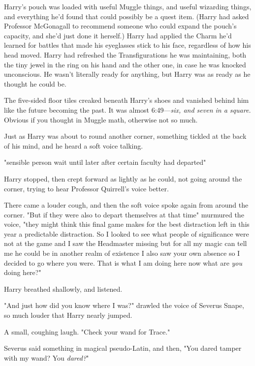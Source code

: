Harry's pouch was loaded with useful Muggle things, and useful wizarding
things, and everything he'd found that could possibly be a quest item. (Harry
had asked Professor McGonagall to recommend someone who could expand the
pouch's capacity, and she'd just done it herself.) Harry had applied the Charm
he'd learned for battles that made his eyeglasses stick to his face, regardless
of how his head moved. Harry had refreshed the Transfigurations he was
maintaining, both the tiny jewel in the ring on his hand and the other one, in
case he was knocked unconscious. He wasn't literally ready for anything, but
Harry was as ready as he thought he could be.

The five-sided floor tiles creaked beneath Harry's shoes and vanished behind
him like the future becoming the past. It was almost 6:49—\emph{six, and seven
in a square.} Obvious if you thought in Muggle math, otherwise not so much.

Just as Harry was about to round another corner, something tickled at the back
of his mind, and he heard a soft voice talking.

"{\el}sensible person{\el} wait until later{\el} after certain faculty
had departed{\el}"

Harry stopped, then crept forward as lightly as he could, not going around the
corner, trying to hear Professor Quirrell's voice better.

There came a louder cough, and then the soft voice spoke again from around the
corner. "But if they were also{\el} to depart themselves{\el} at that
time{\el}" murmured the voice, "they might think{\el} this final
game{\el} makes for the best distraction{\el} left in this year{\el} a
predictable distraction. So I looked{\el} to see what people of
significance{\el} were not at the game{\el} and I saw the Headmaster
missing{\el} but for all my magic can tell me{\el} he could be in
another{\el} realm of existence{\el} I also saw your own absence{\el}
so I decided to go{\el} where you were. That is what I am doing here{\el}
now{\el} what are \emph{you} doing here?"

Harry breathed shallowly, and listened.

"And just how did you know where I was?" drawled the voice of Severus Snape, so
much louder that Harry nearly jumped.

A small, coughing laugh. "Check your wand{\el} for Trace."

Severus said something in magical pseudo-Latin, and then, "You dared tamper
with my wand? You \emph{dared?}"

